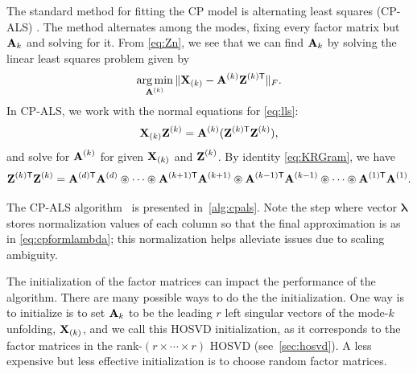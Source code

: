 The standard method for fitting the CP model is alternating least
squares (CP-ALS) \cite{PARAFAC,Kolda:2009}. The method alternates
among the modes, fixing every factor matrix but $\Mn{A}{k}$ and
solving for it. From \cref{eq:Zn}, 
we see that we can find $\Mn{A}{k}$ by solving the linear least squares
problem given by
\begin{equation}
\label{eq:lls}
\argmin_{\M{A}^{(k)}} \|\M{X}_{(k)} - \M{A}^{(k)}\M{Z}^{(k)\trans}\|_F.
\end{equation}
In CP-ALS, we work with the normal equations for \cref{eq:lls}:
\begin{displaymath}
\M{X}_{(k)}\M{Z}^{(k)} = \M{A}^{(k)}(\M{Z}^{(k)\trans}\M{Z}^{(k)}),
\end{displaymath}
and solve for $\M{A}^{(k)}$ for given $\M{X}_{(k)}$ and $\M{Z}^{(k)}$.
By identity \cref{eq:KRGram}, we have 
\begin{equation}
\label{eqn:nicegram}
\M{Z}^{(k)\trans}\M{Z}^{(k)} = \M{A}^{(d)\trans}\M{A}^{(d)} \circledast \dots \circledast \M{A}^{(k+1)\trans}\M{A}^{(k+1)} \circledast \M{A}^{(k-1)\trans}\M{A}^{(k-1)} \circledast \cdots \circledast \M{A}^{(1)\trans}\M{A}^{(1)}.
\end{equation}

The CP-ALS algorithm~\cite{Kolda:2009} is presented
in~\cref{alg:cpals}. Note the step where vector $\bm{\lambda}$ stores
normalization values of each column so that the final approximation is
as in \cref{eq:cpformlambda}; this normalization helps alleviate
issues due to scaling ambiguity.

The initialization of the factor matrices
can impact the performance of the algorithm.
There are many possible ways to do the the initialization.
One way is to
initialize is to set $\Mn{A}{k}$ to be the leading $r$ left singular
vectors of the mode-$k$ unfolding, $\M{X}_{(k)}$, and we call this
HOSVD initialization, as it corresponds to the factor matrices
in the rank-$(r{\times} {\cdots} {\times} r)$ HOSVD (see~\cref{sec:hosvd}). 
A less expensive but less effective initialization is to
choose random factor matrices.

